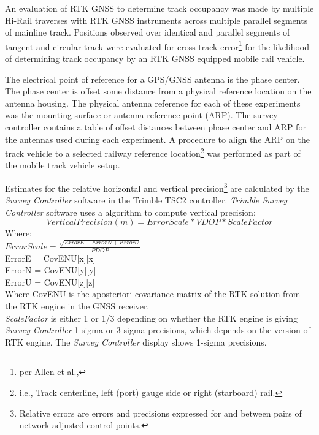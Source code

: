 An evaluation of RTK GNSS to determine track occupancy was made by multiple Hi-Rail traverses with RTK GNSS instruments across multiple parallel segments of mainline track. Positions observed over identical and parallel segments of tangent and circular track were evaluated for cross-track error\footnote{per Allen et al., \pageref{fig:trackRef}} for the likelihood of determining track occupancy by an RTK GNSS equipped mobile rail vehicle.

The electrical point of reference for a GPS/GNSS antenna is the phase center. The phase center is offset some distance from a physical reference location on the antenna housing. The physical antenna reference for each of these experiments was the mounting surface or antenna reference point (ARP). The survey controller contains a table of offset distances between phase center and ARP for the antennas used during each experiment. A procedure to align the ARP on the track vehicle to a selected railway reference location\footnote{i.e., Track centerline, left (port) gauge side or right (starboard) rail.} was performed as part of the mobile track vehicle setup.

Estimates for the relative horizontal and vertical precision\footnote{Relative errors are errors and precisions expressed for and between pairs of network adjusted control points.} are calculated by the \emph{Survey Controller} software in the Trimble TSC2 controller. \emph{Trimble Survey Controller} software uses a algorithm to compute vertical precision:
	\begin{equation}
Vertical Precision (m) = ErrorScale * VDOP * ScaleFactor
	\end{equation}
Where:\\
${ErrorScale = \frac{\sqrt{ErrorE + ErrorN + ErrorU}}{PDOP}}$\\
ErrorE = CovENU[x][x]\\
ErrorN = CovENU[y][y]\\
ErrorU = CovENU[z][z]\\

Where CovENU is the aposteriori covariance matrix of the RTK solution from the RTK engine in the GNSS receiver.\\
\emph{ScaleFactor} is either 1 or 1/3 depending on whether the RTK engine is giving \emph{Survey Controller} 1-sigma or 3-sigma precisions, which depends on the version of RTK engine. The \emph{Survey Controller} display shows 1-sigma precisions.~\citep{Trimble2009vprec}\\

